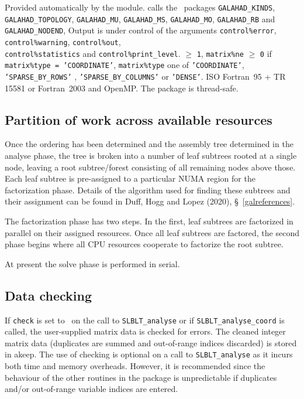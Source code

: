 \documentclass{galahad}
\newcommand{\packagename}{SLBLT}
\begin{document}

\galgeneral

\galworkspace Provided automatically by the module.
\galmodules {\tt \packagename\_solve} calls the \galahad\ packages
{\tt GALAHAD\_KINDS},
{\tt GALAHAD\_TOPOLOGY},
{\tt GALAHAD\_MU},
{\tt GALAHAD\_MS},
{\tt GALAHAD\_MO},
{\tt GALAHAD\_RB} and
{\tt GALAHAD\_NODEND},
\galio Output is under control of the arguments
{\tt control\%error},
{\tt control\%warning},
{\tt control\%out}, \\
{\tt control\-\%statistics}
and {\tt control\%print\_level}.
 $\geq$ {\tt 1},
{\tt matrix\%ne} $\geq$ {\tt 0} if
{\tt matrix\%type = 'COORDINATE'},
{\tt matrix\%type}
one of
{\tt 'COORDINATE'}, {\tt 'SPARSE\_BY\_ROWS'} , {\tt 'SPARSE\_BY\_COLUMNS'} 
or   {\tt 'DENSE'}.
\galportability ISO Fortran~95 + TR 15581 or Fortran~2003 and OpenMP.
The package is thread-safe.


\galmethod

\subsection{Partition of work across available resources}
\label{partition-of-work-across-available-resources}
Once the ordering has been determined and the assembly tree determined in the
analyse phase, the tree is broken into a number of leaf subtrees rooted at a
single node, leaving a root subtree/forest consisting of all remaining nodes
above those. Each leaf subtree is pre-assigned to a particular 
NUMA region 
for the factorization phase. Details of the algorithm 
used for finding these subtrees and their assignment can be found in 
Duff, Hogg and Lopez (2020), \S~\ref{galreferences}.

The factorization phase has two steps. In the first, leaf subtrees are
factorized in parallel on their assigned resources. Once all leaf subtrees are
factored, the second phase begins where all CPU resources cooperate to factorize
the root subtree.

At present the solve phase is performed in serial.

\subsection{Data checking}
If {\tt check} is set to \true\ on the call to {\tt \packagename\_analyse} or if
{\tt \packagename\_analyse\_coord} is called, the user-supplied matrix data is
checked for errors. The cleaned integer matrix data (duplicates are
summed and out-of-range indices discarded) is stored in akeep. The use
of checking is optional on a call to {\tt \packagename\_analyse} as it incurs 
both time and memory overheads. However, it is recommended since the
behaviour of the other routines in the package is unpredictable if
duplicates and/or out-of-range variable indices are entered.
\end{document}
